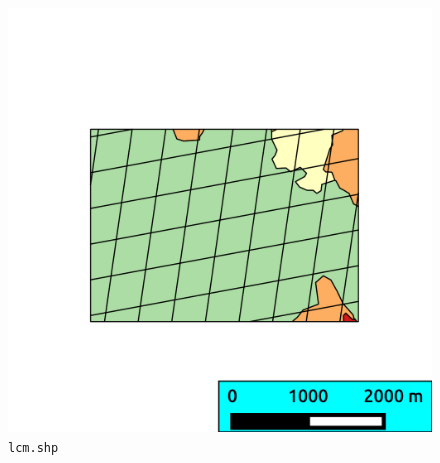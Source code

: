 \documentclass[twoside,a4paper]{refart}
\begin{document}
\begin{figure}
\includegraphics{thumbs/lcm}
\caption{\texttt{lcm.shp}}
\end{figure}
\end{document}
